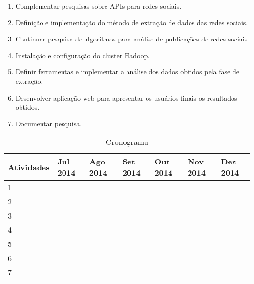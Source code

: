 \begin{enumerate}

  \item Complementar pesquisas sobre APIs para redes sociais.
  \item Definição e implementação do método de extração de dados das redes sociais.
  \item Continuar pesquisa de algoritmos para análise de publicações de redes sociais.
  \item Instalação e configuração do cluster Hadoop.
  \item Definir ferramentas e implementar a análise dos dados obtidos pela fase de extração.
  \item Desenvolver aplicação web para apresentar os usuários finais os resultados obtidos.
  \item Documentar pesquisa.

\end{enumerate}


\begin{table}[!ht]
\begin{center}
  \begin{tabular}{|p{2cm}|p{2cm}|p{2cm}|p{2cm}|p{2cm}|p{2cm}|p{2cm}|}
	\hline
	Atividades & Jul 2014 & Ago 2014 & Set 2014 & Out 2014 & Nov 2014 & Dez 2014
	\\ \hline
	1 & \cellcolor{Gray} & & & & &
	\\ \hline
	2 & \cellcolor{Gray} & \cellcolor{Gray} & & & &
	\\ \hline
	3 & & \cellcolor{Gray} & \cellcolor{Gray} & & &
	\\ \hline
	4 & \cellcolor{Gray} & \cellcolor{Gray} & \cellcolor{Gray} & \cellcolor{Gray} & &
	\\ \hline
	5 & & & \cellcolor{Gray} & \cellcolor{Gray} & &
	\\ \hline
	6 & & & & & \cellcolor{Gray} & \cellcolor{Gray}
	\\ \hline
	7 & \cellcolor{Gray} & \cellcolor{Gray} & \cellcolor{Gray} & \cellcolor{Gray} & \cellcolor{Gray} & \cellcolor{Gray}
	\\ \hline
  \end{tabular}
  \caption{Cronograma}
\label{tab-cron}
\end{center}
\end{table}
\FloatBarrier














